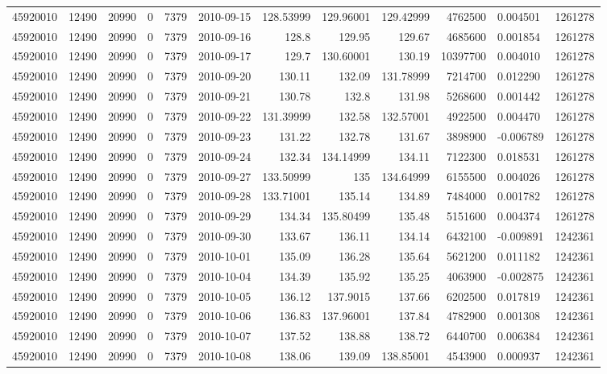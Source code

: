 \begin{tabular}{l | r | r | r | r | l | r | r | r | r | l | r}
45920010 & 12490 & 20990 & 0 & 7379 & 2010-09-15 & 128.53999 & 129.96001 & 129.42999 & 4762500 & 0.004501 & 1261278 \\
45920010 & 12490 & 20990 & 0 & 7379 & 2010-09-16 & 128.8 & 129.95 & 129.67 & 4685600 & 0.001854 & 1261278 \\
45920010 & 12490 & 20990 & 0 & 7379 & 2010-09-17 & 129.7 & 130.60001 & 130.19 & 10397700 & 0.004010 & 1261278 \\
45920010 & 12490 & 20990 & 0 & 7379 & 2010-09-20 & 130.11 & 132.09 & 131.78999 & 7214700 & 0.012290 & 1261278 \\
45920010 & 12490 & 20990 & 0 & 7379 & 2010-09-21 & 130.78 & 132.8 & 131.98 & 5268600 & 0.001442 & 1261278 \\
45920010 & 12490 & 20990 & 0 & 7379 & 2010-09-22 & 131.39999 & 132.58 & 132.57001 & 4922500 & 0.004470 & 1261278 \\
45920010 & 12490 & 20990 & 0 & 7379 & 2010-09-23 & 131.22 & 132.78 & 131.67 & 3898900 & -0.006789 & 1261278 \\
45920010 & 12490 & 20990 & 0 & 7379 & 2010-09-24 & 132.34 & 134.14999 & 134.11 & 7122300 & 0.018531 & 1261278 \\
45920010 & 12490 & 20990 & 0 & 7379 & 2010-09-27 & 133.50999 & 135 & 134.64999 & 6155500 & 0.004026 & 1261278 \\
45920010 & 12490 & 20990 & 0 & 7379 & 2010-09-28 & 133.71001 & 135.14 & 134.89 & 7484000 & 0.001782 & 1261278 \\
45920010 & 12490 & 20990 & 0 & 7379 & 2010-09-29 & 134.34 & 135.80499 & 135.48 & 5151600 & 0.004374 & 1261278 \\
45920010 & 12490 & 20990 & 0 & 7379 & 2010-09-30 & 133.67 & 136.11 & 134.14 & 6432100 & -0.009891 & 1242361 \\
45920010 & 12490 & 20990 & 0 & 7379 & 2010-10-01 & 135.09 & 136.28 & 135.64 & 5621200 & 0.011182 & 1242361 \\
45920010 & 12490 & 20990 & 0 & 7379 & 2010-10-04 & 134.39 & 135.92 & 135.25 & 4063900 & -0.002875 & 1242361 \\
45920010 & 12490 & 20990 & 0 & 7379 & 2010-10-05 & 136.12 & 137.9015 & 137.66 & 6202500 & 0.017819 & 1242361 \\
45920010 & 12490 & 20990 & 0 & 7379 & 2010-10-06 & 136.83 & 137.96001 & 137.84 & 4782900 & 0.001308 & 1242361 \\
45920010 & 12490 & 20990 & 0 & 7379 & 2010-10-07 & 137.52 & 138.88 & 138.72 & 6440700 & 0.006384 & 1242361 \\
45920010 & 12490 & 20990 & 0 & 7379 & 2010-10-08 & 138.06 & 139.09 & 138.85001 & 4543900 & 0.000937 & 1242361 \\

\end{tabular}
